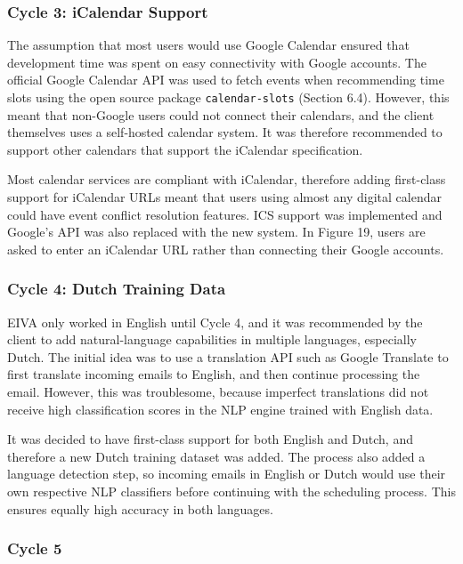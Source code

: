 \documentclass{article}
\begin{document}
\subsubsection{Cycle 3: iCalendar Support}

The assumption that most users would use Google Calendar ensured that development time was spent on easy connectivity with Google accounts. The official Google Calendar API was used to fetch events when recommending time slots using the open source package \texttt{calendar-slots} (Section 6.4). However, this meant that non-Google users could not connect their calendars, and the client themselves uses a self-hosted calendar system. It was therefore recommended to support other calendars that support the iCalendar specification.

Most calendar services are compliant with iCalendar, therefore adding first-class support for iCalendar URLs meant that users using almost any digital calendar could have event conflict resolution features. ICS support was implemented and Google's API was also replaced with the new system. In Figure 19, users are asked to enter an iCalendar URL rather than connecting their Google accounts.

\subsubsection{Cycle 4: Dutch Training Data}

EIVA only worked in English until Cycle 4, and it was recommended by the client to add natural-language capabilities in multiple languages, especially Dutch. The initial idea was to use a translation API such as Google Translate to first translate incoming emails to English, and then continue processing the email. However, this was troublesome, because imperfect translations did not receive high classification scores in the NLP engine trained with English data.

It was decided to have first-class support for both English and Dutch, and therefore a new Dutch training dataset was added. The process also added a language detection step, so incoming emails in English or Dutch would use their own respective NLP classifiers before continuing with the scheduling process. This ensures equally high accuracy in both languages.

\subsubsection{Cycle 5}
\end{document}
